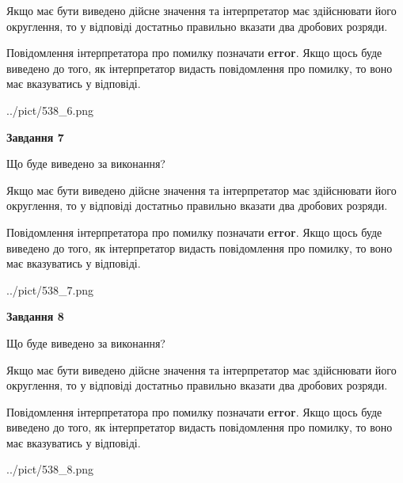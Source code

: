 \documentclass[12pt, ukrainian]{article}
\begin{document}
{\begin {Large}
Якщо має бути виведено дійсне значення та інтерпретатор має здійснювати його округлення, 
то у відповіді достатньо правильно вказати два дробових розряди.

Повідомлення інтерпретатора про помилку позначати \textbf{error}.
Якщо щось буде виведено до того, як інтерпретатор видасть повідомлення про помилку, 
то воно має вказуватись у відповіді. \par

\begin{center}
	{../pict/538_6.png}
\end{center}
\newpage

{\begin {center}\textbf{Завдання 7}\end {center}}\par
Що буде виведено за виконання? \par

Якщо має бути виведено дійсне значення та інтерпретатор має здійснювати його округлення, 
то у відповіді достатньо правильно вказати два дробових розряди.

Повідомлення інтерпретатора про помилку позначати \textbf{error}.
Якщо щось буде виведено до того, як інтерпретатор видасть повідомлення про помилку, 
то воно має вказуватись у відповіді. \par

\begin{center}
	{../pict/538_7.png}
\end{center}
\newpage

{\begin {center}\textbf{Завдання 8}\end {center}}\par
Що буде виведено за виконання? \par

Якщо має бути виведено дійсне значення та інтерпретатор має здійснювати його округлення, 
то у відповіді достатньо правильно вказати два дробових розряди.

Повідомлення інтерпретатора про помилку позначати \textbf{error}.
Якщо щось буде виведено до того, як інтерпретатор видасть повідомлення про помилку, 
то воно має вказуватись у відповіді. \par

\begin{center}
	{../pict/538_8.png}
\end{center}
\newpage


\end{Large}}
\end{document}
